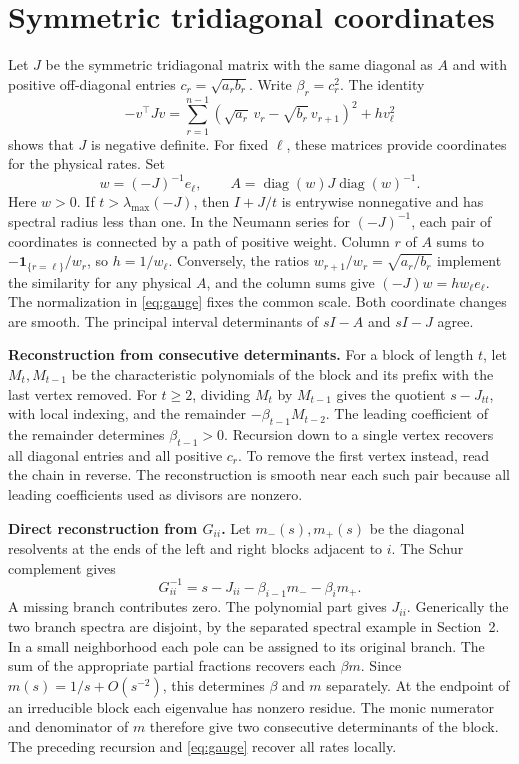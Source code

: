 \documentclass[11pt,a4paper]{article}
\newcommand{\ind}{\mathbf{1}}
\newcommand{\sect}[1]{\section{#1}}
\begin{document}
\sect{Symmetric tridiagonal coordinates}
Let \(J\) be the symmetric tridiagonal matrix with the same diagonal as \(A\) and with positive off-diagonal entries \(c_r=\sqrt{a_rb_r}\). Write \(\beta_r=c_r^2\). The identity
\[
 -v^\top Jv=\sum_{r=1}^{n-1}(\sqrt{a_r}\,v_r-\sqrt{b_r}\,v_{r+1})^2+h v_\ell^2
\]
shows that \(J\) is negative definite. For fixed \(\ell\), these matrices provide coordinates for the physical rates. Set
\begin{equation}
 w=(-J)^{-1}e_\ell,\qquad A=\operatorname{diag}(w)J\operatorname{diag}(w)^{-1}.
 \label{eq:gauge}
\end{equation}
Here \(w>0\). If \(t>\lambda_{\max}(-J)\), then \(I+J/t\) is entrywise nonnegative and has spectral radius less than one. In the Neumann series for \((-J)^{-1}\), each pair of coordinates is connected by a path of positive weight. Column \(r\) of \(A\) sums to \(-\ind_{\{r=\ell\}}/w_r\), so \(h=1/w_\ell\). Conversely, the ratios \(w_{r+1}/w_r=\sqrt{a_r/b_r}\) implement the similarity for any physical \(A\), and the column sums give \((-J)w=h w_\ell e_\ell\). The normalization in \eqref{eq:gauge} fixes the common scale. Both coordinate changes are smooth. The principal interval determinants of \(sI-A\) and \(sI-J\) agree.

\noindent\textbf{Reconstruction from consecutive determinants.}
For a block of length \(t\), let \(M_t,M_{t-1}\) be the characteristic polynomials of the block and its prefix with the last vertex removed. For \(t\ge2\), dividing \(M_t\) by \(M_{t-1}\) gives the quotient \(s-J_{tt}\), with local indexing, and the remainder \(-\beta_{t-1}M_{t-2}\). The leading coefficient of the remainder determines \(\beta_{t-1}>0\). Recursion down to a single vertex recovers all diagonal entries and all positive \(c_r\). To remove the first vertex instead, read the chain in reverse. The reconstruction is smooth near each such pair because all leading coefficients used as divisors are nonzero.

\noindent\textbf{Direct reconstruction from \(G_{ii}\).}
Let \(m_-(s),m_+(s)\) be the diagonal resolvents at the ends of the left and right blocks adjacent to \(i\). The Schur complement gives
\[
 G_{ii}^{-1}=s-J_{ii}-\beta_{i-1}m_--\beta_i m_+ .
\]
A missing branch contributes zero. The polynomial part gives \(J_{ii}\). Generically the two branch spectra are disjoint, by the separated spectral example in Section~2. In a small neighborhood each pole can be assigned to its original branch. The sum of the appropriate partial fractions recovers each \(\beta m\). Since \(m(s)=1/s+O(s^{-2})\), this determines \(\beta\) and \(m\) separately. At the endpoint of an irreducible block each eigenvalue has nonzero residue. The monic numerator and denominator of \(m\) therefore give two consecutive determinants of the block. The preceding recursion and \eqref{eq:gauge} recover all rates locally.
\end{document}
